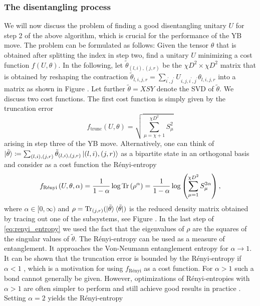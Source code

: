 \subsubsection*{\hspace{132pt}The disentangling process}
We will now discuss the problem of finding a good disentangling unitary $U$ for step 2 of the above algorithm, which is crucial for the performance of the YB move. The problem can be formulated as follows: Given the tensor $\theta$ that is obtained after splitting the index in step two, find a unitary $U$ minimizing a cost function $f(U, \theta)$. In the following, let $\tilde{\theta}_{(l,i),(j,r)}$ be the $\chi D^2\times \chi D^2$ matrix that is obtained by reshaping the contraction $\tilde{\theta}_{l,i,j,r} = \sum_{i^\prime,j^\prime} U_{i,j,i^\prime,j^\prime}\theta_{l,i,j,r}$ into a matrix as shown in Figure . Let further $\tilde{\theta} = XSY$ denote the SVD of $\tilde{\theta}$. We discuss two cost functions. The first cost function is simply given by the truncation error
\begin{equation}
	\label{eq:YB_move_disent_cost_function_truncation_error}
	f_\text{trunc}\left(U,\theta\right) = \sqrt{\sum_{\mu = \chi+1}^{\chi D^2}S_\mu^2}
\end{equation}
arising in step three of the YB move. Alternatively, one can think of $|\tilde{\theta}\rangle \coloneqq \sum_{(l,i), (j,r)}\tilde{\theta}_{(l,i),(j,r)}\ket{(l,i), (j, r)}$ as a bipartite state in an orthogonal basis and consider as a cost function the Rényi-entropy
\begin{equation}
	\label{eq:renyi_entropy}
	f_\text{Rényi}\left(U,\theta,\alpha\right) = \frac{1}{1-\alpha}\log\operatorname{Tr}\left(\rho^\alpha\right) = \frac{1}{1-\alpha}\log\left(\sum_{\mu=1}^{\chi D^2}S_\mu^{2\alpha}\right),
\end{equation}
where $\alpha\in[0,\infty)$ and $\rho = \operatorname{Tr}_{(j, r)}(\ket{\tilde{\theta}}\bra{\tilde{\theta}})$ is the reduced density matrix obtained by tracing out one of the subsystems, see Figure . In the last step of \eqref{eq:renyi_entropy} we used the fact that the eigenvalues of $\rho$ are the squares of the singular values of $\tilde{\theta}$. The Rényi-entropy can be used as a measure of entanglement. It approaches the Von-Neumann entanglement entropy for $\alpha\rightarrow 1$. It can be shown that the truncation error is bounded by the Rényi-entropy if $\alpha < 1$ \cite{cite:mps_represent_ground_states_faithfully}, which is a motivation for using $f_\text{Rényi}$ as a cost function. For $\alpha > 1$ such a bond cannot generally be given. However, optimizations of Rényi-entropies with $\alpha > 1$ are often simpler to perform and still achieve good results in practice \cite{cite:isometric_tensor_network_states_in_two_dimensions, cite:efficient_simulation_of_dynamics_in_two_dimensional_quantum_spin_systems, cite:finding_purifications_with_minimal_entanglement}. Setting $\alpha = 2$ yields the Rényi-entropy
